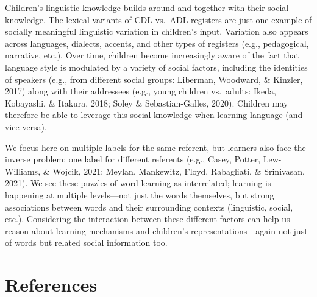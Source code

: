 \documentclass[10pt, letterpaper]{article}
\begin{document}
Children's linguistic knowledge builds around and together with their
social knowledge. The lexical variants of CDL vs.~ADL registers are just
one example of socially meaningful linguistic variation in children's
input. Variation also appears across languages, dialects, accents, and
other types of registers (e.g., pedagogical, narrative, etc.). Over
time, children become increasingly aware of the fact that language style
is modulated by a variety of social factors, including the identities of
speakers (e.g., from different social groups: Liberman, Woodward, \&
Kinzler, 2017) along with their addressees (e.g., young children
vs.~adults: Ikeda, Kobayashi, \& Itakura, 2018; Soley \&
Sebastian-Galles, 2020). Children may therefore be able to leverage this
social knowledge when learning language (and vice versa).

We focus here on multiple labels for the same referent, but learners
also face the inverse problem: one label for different referents (e.g.,
Casey, Potter, Lew-Williams, \& Wojcik, 2021; Meylan, Mankewitz, Floyd,
Rabagliati, \& Srinivasan, 2021). We see these puzzles of word learning
as interrelated; learning is happening at multiple levels---not just the
words themselves, but strong associations between words and their
surrounding contexts (linguistic, social, etc.). Considering the
interaction between these different factors can help us reason about
learning mechanisms and children's representations---again not just of
words but related social information too.

\hypertarget{references}{%
\section{References}\label{references}}

\setlength{\parindent}{-0.1in} 
\setlength{\leftskip}{0.125in}

\noindent
\end{document}
